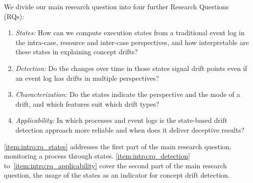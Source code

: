 We divide our main research question into four further Research Questions (RQs):
\begin{enumerate}[label=\textbf{RQ\arabic*}, ref=RQ\arabic*, leftmargin=*]
	\item\label{item:intro:rq_states} \emph{States:} How can we compute execution states from a traditional event log in the intra-case, resource and inter-case perspectives, and how interpretable are these states in explaining concept drifts?
	\item\label{item:intro:rq_detection} \emph{Detection:} Do the changes over time in those states signal drift points even if an event log has drifts in multiple perspectives?
	\item\label{item:intro:rq_characterization} \emph{Characterization:} Do the states indicate the perspective and the mode of a drift, and which features suit which drift types?
	\item\label{item:intro:rq_applicability} \emph{Applicability:} In which processes and event logs is the state-based drift detection approach more reliable and when does it deliver deceptive results?
\end{enumerate}
\ref{item:intro:rq_states} addresses the first part of the main research question, monitoring a process through states. \ref{item:intro:rq_detection} to~\ref{item:intro:rq_applicability} cover the second part of the main research question, the usage of the states as an indicator for concept drift detection.

